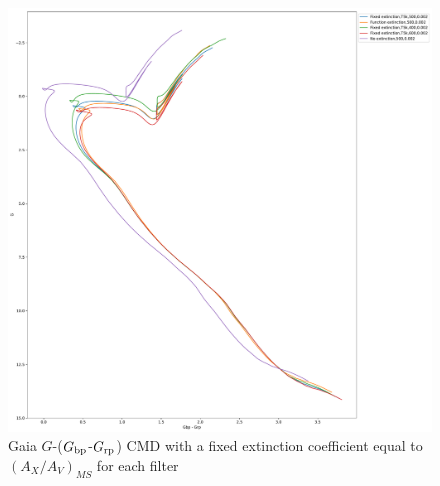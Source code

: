 \documentclass[12pt, a4paper]{report}
\begin{document}
\begin{figure}[h]
\begin{center}
\includegraphics[scale=0.25]{../basti_isochrones_10_13Gyr/Extinction_T5k_FeH0fix_func_G_GbpmGrp_500_400_600_Myr_FeH_0p002_ref_noext_Av_1p0.pdf}
\caption{Gaia $G$-($G_{\textnormal{bp}}$-$G_{\textnormal{rp}}$) CMD with a fixed extinction coefficient equal to $(A_{X}/A_{V})_{MS}$ for each filter}
\label{gaia_isoc_T5k}
\end{center}
\end{figure}
\end{document}
